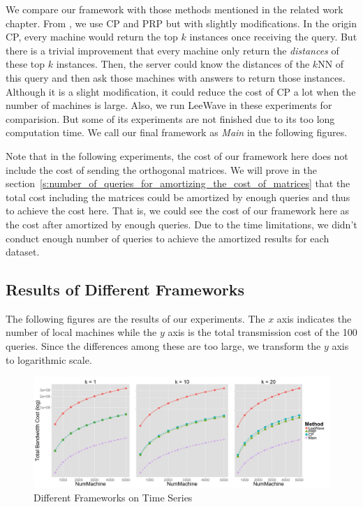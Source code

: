 We compare our framework with those methods mentioned in the related work chapter.  From \cite{PRP}, we use CP and PRP but with slightly modifications. In the origin CP, every machine would return the top $k$ instances once receiving the query.  But there is a trivial improvement that every machine only return the \emph{distances} of these top $k$ instances.  Then, the server could know the distances of the $k$NN of this query and then ask those machines with answers to return those instances.  Although it is a slight modification, it could reduce the cost of CP a lot when the number of machines is large.  Also, we run LeeWave \cite{LeeWave} in these experiments for comparision. But some of its experiments are not finished due to its too long computation time. We call our final framework as \emph{Main} in the following figures.


Note that in the following experiments, the cost of our framework here does not include the cost of sending the orthogonal matrices.  We will prove in the section~\ref{s:number_of_queries_for_amortizing_the_cost_of_matrices} that the total cost including the matrices could be amortized by enough queries and thus to achieve the cost here.  That is, we could see the cost of our framework here as the cost after amortized by enough queries.  Due to the time limitations, we didn't conduct enough number of queries to achieve the amortized results for each dataset.



\subsection{Results of Different Frameworks} %
\label{sub:results_of_different_fra}

The following figures are the results of our experiments.  The $x$ axis indicates the number of local machines while the $y$ axis is the total transmission cost of the 100 queries.  Since the differences among these are too large, we transform the $y$ axis to logarithmic scale.  

\begin{figure}[htpb!]
  \centering
  \includegraphics[width=1.0\linewidth]{exp/out/time.png}
  \caption{Different Frameworks on Time Series}
  \label{fig:out_time}
\end{figure}

